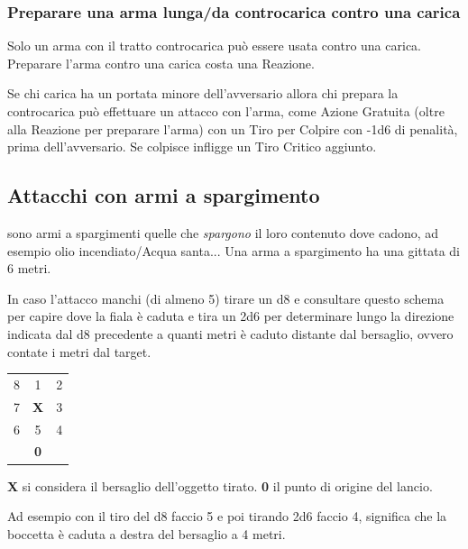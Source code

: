 \begin{multicols}{2}
\subsubsection{Preparare una arma lunga/da controcarica contro una carica} \label{prepararearmalungacontrocarica}

Solo un arma con il tratto controcarica può essere usata contro una carica. Preparare l'arma contro una carica costa una Reazione.

Se chi carica ha un portata minore dell'avversario allora chi prepara la controcarica può effettuare un attacco con l'arma, come Azione Gratuita (oltre alla Reazione per preparare l'arma) con un Tiro per Colpire con -1d6 di penalità, prima dell'avversario. Se colpisce infligge un Tiro Critico aggiunto.


\subsection{Attacchi con armi a spargimento} \label{attacchiarmidaspargimento}\hypertarget{spargimento}{}

sono armi a spargimenti quelle che \emph{spargono} il loro contenuto dove cadono, ad esempio olio incendiato/Acqua santa... Una arma a spargimento ha una gittata di 6 metri.

In caso l'attacco manchi (di almeno 5) tirare un d8 e consultare questo schema per capire dove la fiala è caduta e tira un 2d6 per determinare lungo la direzione indicata dal d8 precedente a quanti metri è caduto distante dal bersaglio, ovvero contate i metri dal target.

\medskip

\begin{tabular}{ccc}
	8& 1& 2\\
	7 &\textbf{X}& 3\\
	6 &5 &4\\
	&\textbf{0}&
\end{tabular}

\smallskip

\textbf{X} si considera il bersaglio dell'oggetto tirato. \textbf{0} il punto di origine del lancio.

Ad esempio con il tiro del d8 faccio 5 e poi tirando 2d6 faccio 4, significa che la boccetta è caduta a destra del bersaglio a 4 metri.


\end{multicols}
